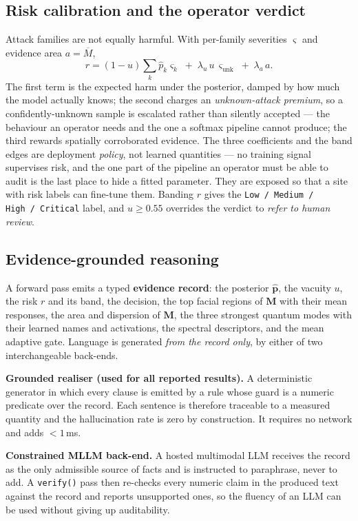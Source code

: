 \documentclass[conference]{IEEEtran}
\newcommand{\bs}[1]{\boldsymbol{#1}}
\begin{document}
\subsection{Risk calibration and the operator verdict}
Attack families are not equally harmful. With per-family severities $\bs{\varsigma}$
and evidence area $a=\overline{M}$,
\begin{equation}
r = (1-u)\sum_{k}\hat{p}_{k}\varsigma_{k} \;+\; \lambda_{u}\,u\,\varsigma_{\text{unk}}
\;+\; \lambda_{a}\,a .
\label{eq:risk}
\end{equation}
The first term is the expected harm under the posterior, damped by how much the
model actually knows; the second charges an \emph{unknown-attack premium}, so a
confidently-unknown sample is escalated rather than silently accepted --- the
behaviour an operator needs and the one a softmax pipeline cannot produce; the third
rewards spatially corroborated evidence. The three coefficients and the band
edges are deployment \emph{policy}, not learned quantities --- no training signal
supervises risk, and the one part of the pipeline an operator must be able to audit
is the last place to hide a fitted parameter. They are exposed so that a site with
risk labels can fine-tune them. Banding $r$ gives the
\texttt{Low\,/\,Medium\,/\,High\,/\,Critical} label, and $u\ge0.55$ overrides the
verdict to \emph{refer to human review}.

\subsection{Evidence-grounded reasoning}
A forward pass emits a typed \textbf{evidence record}: the posterior
$\hat{\bs{p}}$, the vacuity $u$, the risk $r$ and its band, the decision, the
top facial regions of $\bs{M}$ with their mean responses, the area and dispersion of
$\bs{M}$, the three strongest quantum modes with their learned names and
activations, the spectral descriptors, and the mean adaptive gate. Language is
generated \emph{from the record only}, by either of two interchangeable back-ends.

\textbf{Grounded realiser (used for all reported results).} A deterministic
generator in which every clause is emitted by a rule whose guard is a numeric
predicate over the record. Each sentence is therefore traceable to a measured
quantity and the hallucination rate is zero by construction. It requires no network
and adds $<1$\,ms.

\textbf{Constrained MLLM back-end.} A hosted multimodal LLM receives the record as
the only admissible source of facts and is instructed to paraphrase, never to add.
A \texttt{verify()} pass then re-checks every numeric claim in the produced text
against the record and reports unsupported ones, so the fluency of an LLM can be
used without giving up auditability.
\end{document}
